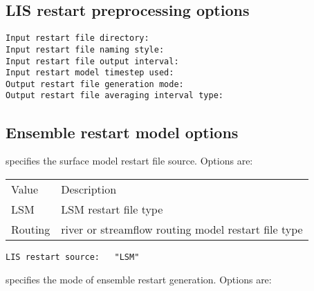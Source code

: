  
 \subsection{LIS restart preprocessing options} \label{ssec:rstopts}
 

 
  

  

  

  

  

  
 

 \begin{Verbatim}[frame=single]
Input restart file directory:
Input restart file naming style:
Input restart file output interval:
Input restart model timestep used:
Output restart file generation mode:
Output restart file averaging interval type:
 \end{Verbatim}


 
 \subsection{Ensemble restart model options} \label{ssec:ensrstopts}
 


 
 specifies the surface model restart file source. Options are:

 \begin{tabular}{ll}
 Value     & Description                   \\
 LSM       & LSM restart file type         \\ 
 Routing   & river or streamflow routing 
             model restart file type       \\
 \end{tabular}
 

 \begin{Verbatim}[frame=single]
LIS restart source:   "LSM"
 \end{Verbatim}

 
 specifies the mode of ensemble restart generation. Options are:

